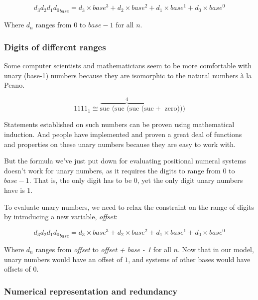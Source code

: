 \documentclass[12pt, a4paper]{article}
\begin{document}
$$
    {d_3d_2d_1d_0}_{base}
    =
    d_3\times base^3 + d_2\times base^2 + d_1\times base^1 + d_0\times base^0
$$

Where $ d_{n} $ ranges from $ 0 $ to $ base - 1 $ for all $ n $.

\subsubsection{Digits of different ranges}

Some computer scientists and mathematicians seem to be more comfortable with
unary (base-1) numbers because they are isomorphic to the natural numbers à la Peano.


$$
    1111_{1} \cong
        \overbrace{\text{suc (suc (suc (suc}}^4 + \text{ zero)))}
$$

Statements established on such numbers can be proven using mathematical
induction. And people have implemented and proven a great deal of functions and
properties on these unary numbers because they are easy to work with.

But the formula we've just put down for evaluating positional numeral systems
doesn't work for unary numbers, as it requires the digits to range from $ 0 $ to
$ base - 1 $. That is, the only digit has to be $ 0 $, yet the only digit unary
numbers have is $ 1 $.

To evaluate unary numbers, we need to relax the constraint on the range of digits
by introducing a new variable, \textit{offset}:

$$
    {d_3d_2d_1d_0}_{base}
    =
    d_3\times base^3 + d_2\times base^2 + d_1\times base^1 + d_0\times base^0
$$

Where $ d_{n} $ ranges from \textit{offset} to \textit{offset + base - 1} for
all $ n $. Now that in our model, unary numbers would have an offset of $ 1 $,
and systems of other bases would have offsets of $ 0 $.

\subsubsection{Numerical representation and redundancy}





%



\end{document}
